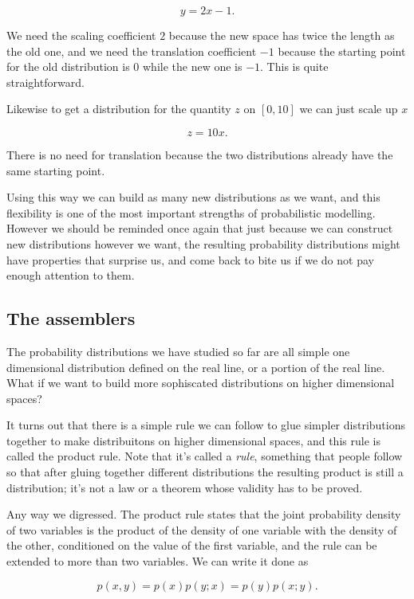 \documentclass[11pt]{article}
\begin{document}
$$ y = 2x - 1.$$

We need the scaling coefficient \(2\) because the new space has twice the length as the old one, and we need the translation coefficient \(-1\) because the starting point for the old distribution is \(0\) while the new one is \(-1\). This is quite straightforward.

Likewise to get a distribution for the quantity \(z\) on \([0, 10]\) we can just scale up \(x\)

$$ z = 10 x.$$

There is no need for translation because the two distributions already have the same starting point.

Using this way we can build as many new distributions as we want, and this flexibility is one of the most important strengths of probabilistic modelling. However we should be reminded once again that just because we can construct new distributions however we want, the resulting probability distributions might have properties that surprise us, and come back to bite us if we do not pay enough attention to them.

\subsection{The assemblers}
\label{sec:org22c20f5}

The probability distributions we have studied so far are all simple one dimensional distribution defined on the real line, or a portion of the real line. What if we want to build more sophiscated distributions on higher dimensional spaces?

It turns out that there is a simple rule we can follow to glue simpler distributions together to make distribuitons on higher dimensional spaces, and this rule is called the product rule. Note that it's called a \emph{rule}, something that people follow so that after gluing together different distributions the resulting product is still a distribution; it's not a law or a theorem whose validity has to be proved.

Any way we digressed. The product rule states that the joint probability density of two variables is the product of the density of one variable with the density of the other, conditioned on the value of the first variable, and the rule can be extended to more than two variables. We can write it done as

$$ p(x, y) = p(x) p(y ; x) = p(y) p(x ; y). $$
\end{document}

